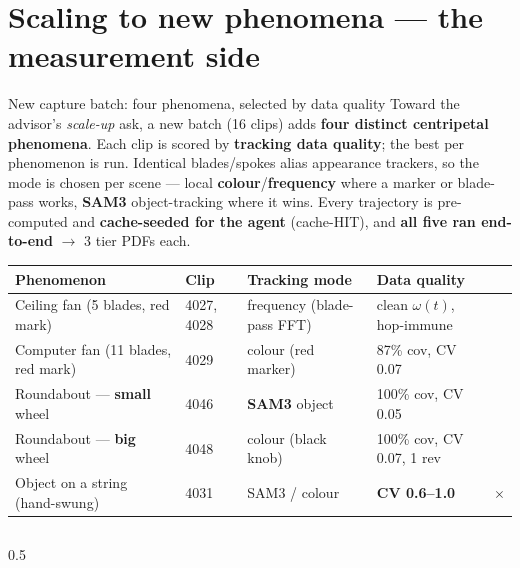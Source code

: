 \documentclass[aspectratio=169,10pt]{beamer}
\newcommand{\hl}[1]{{\bfseries\color{cAccent}#1}}
\newcommand{\ok}{{\color{cApp}\textbf{\checkmark}}}
\begin{document}
\section{Scaling to new phenomena --- the measurement side}

\begin{frame}{New capture batch: four phenomena, selected by data quality}
\scriptsize
Toward the advisor's \emph{scale-up} ask, a new batch (16 clips) adds \textbf{four distinct
centripetal phenomena}. Each clip is scored by \textbf{tracking data quality}; the best per
phenomenon is run. Identical blades/spokes alias appearance trackers, so the mode is chosen per
scene --- local \textbf{colour}/\textbf{frequency} where a marker or blade-pass works, \textbf{SAM3}
object-tracking where it wins. Every trajectory is pre-computed and \hl{cache-seeded for the agent}
(cache-HIT), and \textbf{all five ran end-to-end} $\rightarrow$ 3 tier PDFs each.
\vspace{0.3em}
\renewcommand{\arraystretch}{1.1}
\begin{center}
\begin{tabular}{@{}p{3.15cm}p{1.2cm}p{2.35cm}p{2.75cm}c@{}}
\toprule
\textbf{Phenomenon} & \textbf{Clip} & \textbf{Tracking mode} & \textbf{Data quality} & \\
\midrule
Ceiling fan (5 blades, red mark) & 4027, 4028 & frequency (blade-pass FFT) & clean $\omega(t)$, hop-immune & \ok \\
Computer fan (11 blades, red mark) & 4029 & colour (red marker) & 87\% cov, CV 0.07 & \ok \\
Roundabout --- \textbf{small} wheel & 4046 & \textbf{SAM3} object & 100\% cov, CV 0.05 & \ok \\
Roundabout --- \textbf{big} wheel & 4048 & colour (black knob) & 100\% cov, CV 0.07, 1 rev & \ok \\
Object on a string (hand-swung) & 4031 & SAM3 / colour & \textbf{CV 0.6--1.0} & \textcolor{cAccent}{\ensuremath{\times}} \\
\bottomrule
\end{tabular}
\end{center}
\vspace{0.4em}
\begin{columns}[T]
\begin{column}{0.5\textwidth}
\begin{tcolorbox}[colback=cMeas!6,colframe=cMeas,title=\tiny Mode chosen from the scene,boxsep=1pt,left=3pt,right=3pt]

\end{tcolorbox}
\end{column}
\end{columns}
\end{frame}
\end{document}
